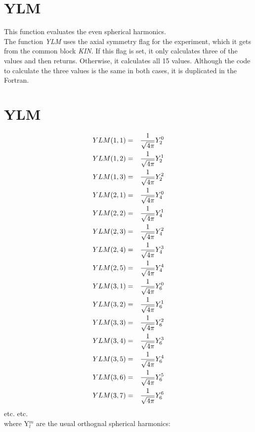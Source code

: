 \section{YLM}
\label{sect:ylm}

\noindent This function evaluates the even spherical harmonics.\\
The function {\em YLM} uses the axial symmetry flag for the experiment,
which it gets from the common block {\em KIN}. If this flag is set, it
only calculates three of the values and then returns. Otherwise, it
calculates all 15 values. Although the code to calculate the three values is
the same in both cases, it is duplicated in the Fortran.\\

\section{YLM}
\begin{eqnarray}
YLM(1,1)&=&{1 \over \sqrt{4 \pi}} Y_2^0\nonumber\\
YLM(1,2)&=&{1 \over \sqrt{4 \pi}} Y_2^1\nonumber\\
YLM(1,3)&=&{1 \over \sqrt{4 \pi}} Y_2^2\nonumber\\
YLM(2,1)&=&{1 \over \sqrt{4 \pi}} Y_4^0\nonumber\\
YLM(2,2)&=&{1 \over \sqrt{4 \pi}} Y_4^1\nonumber\\
YLM(2,3)&=&{1 \over \sqrt{4 \pi}} Y_4^2\nonumber\\
YLM(2,4)&=&{1 \over \sqrt{4 \pi}} Y_4^3\nonumber\\
YLM(2,5)&=&{1 \over \sqrt{4 \pi}} Y_4^4\nonumber\\
YLM(3,1)&=&{1 \over \sqrt{4 \pi}} Y_6^0\nonumber\\
YLM(3,2)&=&{1 \over \sqrt{4 \pi}} Y_6^1\nonumber\\
YLM(3,3)&=&{1 \over \sqrt{4 \pi}} Y_6^2\nonumber\\
YLM(3,4)&=&{1 \over \sqrt{4 \pi}} Y_6^3\nonumber\\
YLM(3,5)&=&{1 \over \sqrt{4 \pi}} Y_6^4\nonumber\\
YLM(3,6)&=&{1 \over \sqrt{4 \pi}} Y_6^5\nonumber\\
YLM(3,7)&=&{1 \over \sqrt{4 \pi}} Y_6^6\nonumber\\
\end{eqnarray}
etc. etc.\\

where Y$_l^m$ are the usual orthognal spherical harmonics:\\

